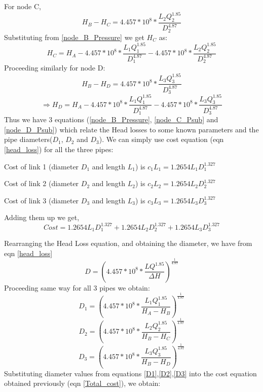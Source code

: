 \documentclass{homework}
\begin{document}
For node C,
\begin{equation}\label{node_C_Pressure}
H_B - H_C = 4.457*10^8*\frac{L_2Q_2^{1.85}}{D_2^{4.87}}
\end{equation}
Substituting from \ref{node_B_Pressure} we get $H_C$ as:
\begin{equation}\label{node_C_Psub}
H_C = H_A - 4.457*10^8*\frac{L_1Q_1^{1.85}}{D_1^{4.87}}-4.457*10^8*\frac{L_2Q_2^{1.85}}{D_2^{4.87}}
\end{equation}
Proceeding similarly for node D:
\begin{equation}\label{node_D_Pressure}
H_B - H_D = 4.457*10^8*\frac{L_3Q_3^{1.85}}{D_3^{4.87}}
\end{equation}
\begin{equation}\label{node_D_Psub}
\Rightarrow H_D = H_A - 4.457*10^8*\frac{L_1Q_1^{1.85}}{D_1^{4.87}}-4.457*10^8*\frac{L_3Q_3^{1.85}}{D_3^{4.87}}
\end{equation}
Thus we have 3 equations (\ref{node_B_Pressure}, \ref{node_C_Psub} and \ref{node_D_Psub}) which relate the Head losses to some known parameters and the pipe diameters($D_1$, $D_2$ and $D_3$).
We can simply use cost equation (eqn \ref{head_loss}) for all the three pipes:

Cost of link 1 (diameter $D_1$ and length $L_1$) is $c_1L_1 = 1.2654L_1D_1^{1.327}$

Cost of link 2 (diameter $D_2$ and length $L_2$) is $c_2L_2 = 1.2654L_2D_2^{1.327}$

Cost of link 3 (diameter $D_3$ and length $L_3$) is $c_3L_3 = 1.2654L_3D_3^{1.327}$

Adding them up we get,
\begin{equation}\label{Total_cost}
Cost = 1.2654L_1D_1^{1.327} + 1.2654L_2D_2^{1.327} + 1.2654L_3D_3^{1.327}
\end{equation}

Rearranging the Head Loss equation, and obtaining the diameter, we have from eqn \ref{head_loss}
\[D = (4.457*10^8*\frac{LQ^{1.85}}{\Delta{H}})^{\frac{1}{4.87}}\]
Proceeding same way for all 3 pipes we obtain:
\begin{equation}\label{D1}
D_1 = (4.457*10^8*\frac{L_1Q_1^{1.85}}{H_A-H_B})^{\frac{1}{4.87}}
\end{equation}
\begin{equation}\label{D2}
D_2 = (4.457*10^8*\frac{L_2Q_2^{1.85}}{H_B-H_C})^{\frac{1}{4.87}}
\end{equation}
\begin{equation}\label{D3}
D_3 = (4.457*10^8*\frac{L_3Q_3^{1.85}}{H_B-H_D})^{\frac{1}{4.87}}
\end{equation}
Substituting diameter values from equations \ref{D1},\ref{D2},\ref{D3} into the cost equation obtained previously (eqn \ref{Total_cost}), we obtain:
\end{document}
